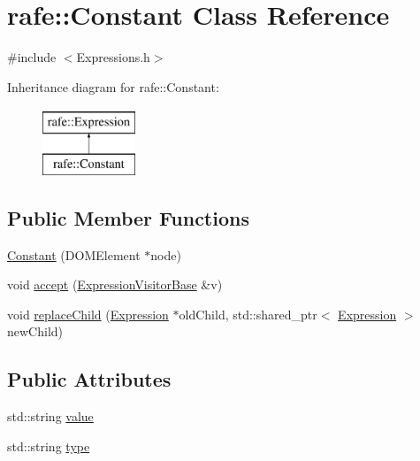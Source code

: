 \hypertarget{classrafe_1_1_constant}{\section{rafe\+:\+:Constant Class Reference}
\label{classrafe_1_1_constant}
}


{\ttfamily \#include $<$Expressions.\+h$>$}

Inheritance diagram for rafe\+:\+:Constant\+:\begin{figure}[H]
\begin{center}
\leavevmode
\includegraphics[height=2.000000cm]{classrafe_1_1_constant}
\end{center}
\end{figure}
\subsection*{Public Member Functions}
\begin{DoxyCompactItemize}
\item 
\hyperlink{classrafe_1_1_constant_a7eacc43b2d938e477496dc8c01b8ead3}{Constant} (D\+O\+M\+Element $\ast$node)
\item 
void \hyperlink{classrafe_1_1_constant_a867e7b315f6501bb88b33d2277b570ae}{accept} (\hyperlink{classrafe_1_1_expression_visitor_base}{Expression\+Visitor\+Base} \&v)
\item 
void \hyperlink{classrafe_1_1_constant_a5c74a0f6230626f3e49ecaae189c7a7f}{replace\+Child} (\hyperlink{classrafe_1_1_expression}{Expression} $\ast$old\+Child, std\+::shared\+\_\+ptr$<$ \hyperlink{classrafe_1_1_expression}{Expression} $>$ new\+Child)
\end{DoxyCompactItemize}
\subsection*{Public Attributes}
\begin{DoxyCompactItemize}
\item 
std\+::string \hyperlink{classrafe_1_1_constant_a22ad86666bbc772993f1f5a84dd209d7}{value}
\item 
std\+::string \hyperlink{classrafe_1_1_constant_a4fcd257fe94e9dcdf3115703904fa001}{type}
\end{DoxyCompactItemize}
